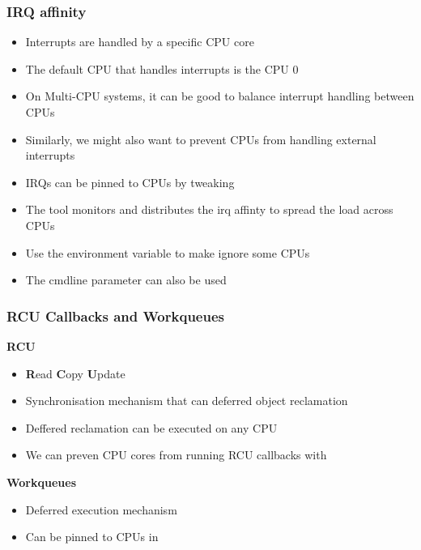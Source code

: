 \begin{frame}
	\frametitle{IRQ affinity}
	\begin{itemize}
		\item Interrupts are handled by a specific CPU core
		\item The default CPU that handles interrupts is the CPU 0
		\item On Multi-CPU systems, it can be good to balance interrupt handling between CPUs
		\item Similarly, we might also want to prevent CPUs from handling external interrupts
		\item IRQs can be pinned to CPUs by tweaking 
		\item The  tool monitors and distributes the irq affinty to spread the load across CPUs
		\item Use the  environment variable to make  ignore some CPUs
		\item The  cmdline parameter can also be used
	\end{itemize}
\end{frame}

\begin{frame}
	\frametitle{RCU Callbacks and Workqueues}
	\begin{center}\textbf{RCU}\end{center}
	\begin{itemize}
		\item \textbf{R}ead \textbf{C}opy \textbf{U}pdate
		\item Synchronisation mechanism that can deferred object reclamation
		\item Deffered reclamation can be executed on any CPU 
		\item We can preven CPU cores from running RCU callbacks with 
	\end{itemize}
	\begin{center}\textbf{Workqueues}\end{center}
	\begin{itemize}
		\item Deferred execution mechanism
		\item Can be pinned to CPUs in 
	\end{itemize}
\end{frame}

